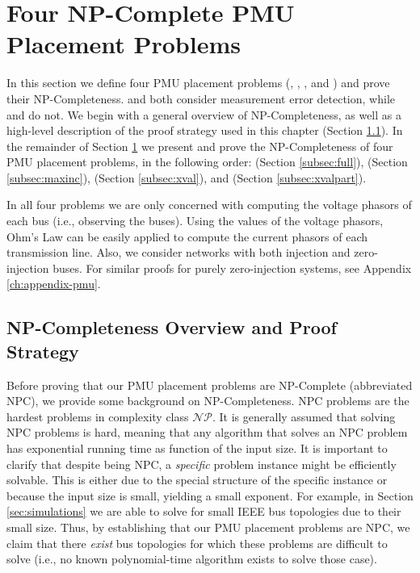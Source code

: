 \section{Four NP-Complete PMU Placement Problems}
\label{sec:problem-analysis}


In this section we define four PMU placement problems (\fulls, \maxincs, \xvals, and \xvalparts) and prove their NP-Completeness. 
\xval and \xvalpart both consider measurement error detection, while \full and \maxinc do not.  
We begin with a general overview of NP-Completeness, as well as a high-level description of the proof strategy used in this chapter (Section \ref{subsec:proofstrat}). 
In the remainder of Section \ref{sec:problem-analysis} we present and prove the NP-Completeness of four PMU placement problems, 
in the following order: \full (Section \ref{subsec:full}), \maxinc (Section \ref{subsec:maxinc}), \xval (Section \ref{subsec:xval}), and \xvalpart (Section \ref{subsec:xvalpart}).

In all four problems we are only concerned with computing the voltage phasors of each bus (i.e., observing the buses). Using the values of the voltage phasors,
Ohm's Law can be easily applied to compute the current phasors of each transmission line.
Also, we consider networks with both injection and zero-injection buses. For similar proofs for purely zero-injection systems, see Appendix \ref{ch:appendix-pmu}.


\subsection{NP-Completeness Overview and Proof Strategy}
\label{subsec:proofstrat}

Before proving that our PMU placement problems are NP-Complete (abbreviated NPC), we provide some background on NP-Completeness. 
NPC problems are the hardest problems in complexity class $\mathcal{NP}$. 
It is generally assumed that solving NPC problems is hard, meaning that any algorithm that solves an NPC problem has exponential running time as function of the input size. 
It is important to clarify that despite being NPC, a {\em specific} problem instance might be efficiently solvable. This is either due to the special structure of the specific instance 
or because the input size is small, yielding a small exponent. 
For example, in Section \ref{sec:simulations} we are able to solve \full for small IEEE bus topologies due to their small size. Thus, by establishing that our PMU placement problems are NPC, 
we claim that there {\em exist} bus topologies for which these problems are difficult to solve (i.e., no known polynomial-time algorithm exists to solve those case).  

